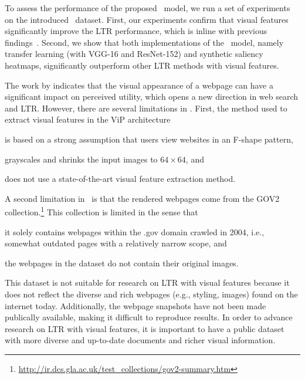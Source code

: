 To assess the performance of the proposed \modelname~model, we run a set of experiments on the introduced \datasetname~dataset.
First, our experiments confirm that visual features significantly improve the \ac{LTR} performance, which is inline with previous findings~\cite{fan2017learning}.
Second, we show that both implementations of the \modelname~model, namely transfer learning (with VGG-16 and ResNet-152) and synthetic saliency heatmaps,
significantly outperform other \ac{LTR} methods with visual features.

The work by \citet{fan2017learning} indicates that the visual appearance of a webpage can have a significant impact on perceived utility, which opens a new direction in web search and \ac{LTR}.
However, there are several limitations in \cite{fan2017learning}.
First, the method used to extract visual features in the ViP architecture
\begin{inparaenum}[(i)]
\item is based on a strong assumption that users view websites in an F-shape pattern, 
\item grayscales and shrinks the input images to $64\times64$, and
\item does not use a state-of-the-art visual feature extraction method.
\end{inparaenum}

A second limitation in~\citep{fan2017learning} is that
the rendered webpages come from the GOV2 collection.\footnote{\url{http://ir.dcs.gla.ac.uk/test_collections/gov2-summary.htm}}
This collection is limited in the sense that 
\begin{inparaenum}[(i)]
\item it solely contains webpages within the .gov domain crawled in 2004, i.e., somewhat outdated pages with a relatively narrow scope, and
\item the webpages in the dataset do not contain their original images.
\end{inparaenum}
This dataset is not suitable for research on \ac{LTR} with visual features because it does not reflect the diverse and rich webpages (e.g., styling, images) found on the internet today. 
Additionally, the webpage snapshots have not been made publically available, making it difficult to reproduce results. 
In order to advance research on \ac{LTR} with visual features, it is important to have a public dataset with more diverse and up-to-date documents and richer visual information.
\fi


